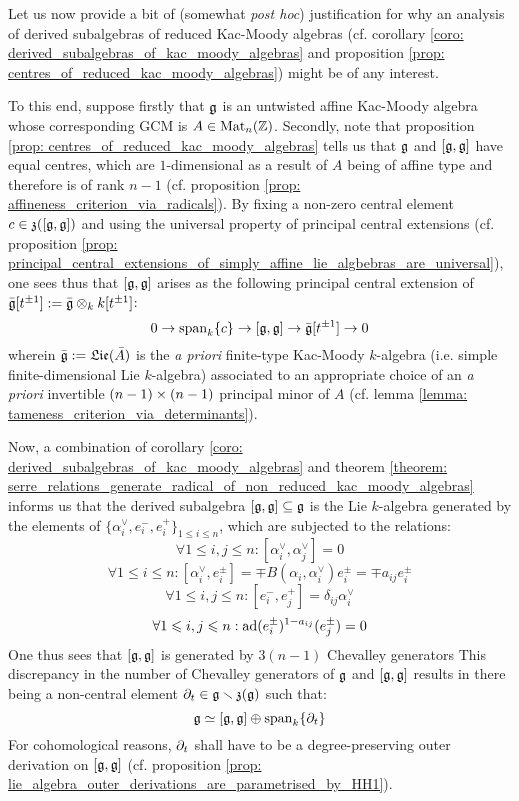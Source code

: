     \begin{remark} \label{remark: derived_subalgebras_and_centres_of_untwisted_affine_kac_moody_algebras}
        Let us now provide a bit of (somewhat \textit{post hoc}) justification for why an analysis of derived subalgebras of reduced Kac-Moody algebras (cf. corollary \ref{coro: derived_subalgebras_of_kac_moody_algebras} and proposition \ref{prop: centres_of_reduced_kac_moody_algebras}) might be of any interest. 
        
        To this end, suppose firstly that $\mathfrak{g}$ is an untwisted affine Kac-Moody algebra whose corresponding GCM is $A \in \mathrm{Mat}_n(\mathbb{Z})$. Secondly, note that proposition \ref{prop: centres_of_reduced_kac_moody_algebras} tells us that $\mathfrak{g}$ and $[\mathfrak{g}, \mathfrak{g}]$ have equal centres, which are $1$-dimensional as a result of $A$ being of affine type and therefore is of rank $n - 1$ (cf. proposition \ref{prop: affineness_criterion_via_radicals}). By fixing a non-zero central element $c \in \mathfrak{z}([\mathfrak{g}, \mathfrak{g}])$ and using the universal property of principal central extensions (cf. proposition \ref{prop: principal_central_extensions_of_simply_affine_lie_algbebras_are_universal}), one sees thus that $[\mathfrak{g}, \mathfrak{g}]$ arises as the following principal central extension of $\bar{\g}[t^{\pm 1}] := \bar{\g} \tensor_k k[t^{\pm 1}]$:
            $$0 \to \operatorname{span}_k \{c\} \to [\mathfrak{g}, \mathfrak{g}] \to \bar{\mathfrak{g}}[t^{\pm 1}] \to 0$$
        wherein $\bar{\mathfrak{g}} := \mathfrak{Lie}(\bar{A})$ is the \textit{a priori} finite-type Kac-Moody $k$-algebra (i.e. simple finite-dimensional Lie $k$-algebra) associated to an appropriate choice of an \textit{a priori} invertible $(n - 1) \x (n - 1)$ principal minor of $A$ (cf. lemma \ref{lemma: tameness_criterion_via_determinants}).
        
        Now, a combination of corollary \ref{coro: derived_subalgebras_of_kac_moody_algebras} and theorem \ref{theorem: serre_relations_generate_radical_of_non_reduced_kac_moody_algebras} informs us that the derived subalgebra $[\mathfrak{g}, \mathfrak{g}] \subseteq \mathfrak{g}$ is the Lie $k$-algebra generated by the elements of $\{\alpha_i^{\vee}, e_i^-, e_i^+\}_{1 \leq i \leq n}$, which are subjected to the relations:
            $$\forall 1 \leq i, j \leq n: [\alpha_i^{\vee}, \alpha_j^{\vee}] = 0$$
            $$\forall 1 \leq i \leq n: [\alpha_i^{\vee}, e_i^{\pm}] = \mp B(\alpha_i, \alpha_i^{\vee}) e_i^{\pm} = \mp a_{ij} e_i^{\pm}$$
            $$\forall 1 \leq i, j \leq n: [e_i^-, e_j^+] = \delta_{ij} \alpha_i^{\vee}$$
            $$\forall 1 \leqslant i, j \leqslant n: \mathrm{ad}(e_i^{\pm})^{1 - a_{ij}}(e_j^{\pm}) = 0$$
        One thus sees that $[\mathfrak{g}, \mathfrak{g}]$ is generated by $3(n - 1)$ Chevalley generators This discrepancy in the number of Chevalley generators of $\mathfrak{g}$ and $[\mathfrak{g}, \mathfrak{g}]$ results in there being a non-central element $\partial_t \in \mathfrak{g} \smallsetminus \mathfrak{z}(\mathfrak{g})$ such that:
            $$\mathfrak{g} \simeq [\mathfrak{g}, \mathfrak{g}] \oplus \operatorname{span}_k \{\partial_t\}$$
        For cohomological reasons, $\partial_t$ shall have to be a degree-preserving outer derivation on $[\mathfrak{g}, \mathfrak{g}]$ (cf. proposition \ref{prop: lie_algebra_outer_derivations_are_parametrised_by_HH1}).
    \end{remark}

